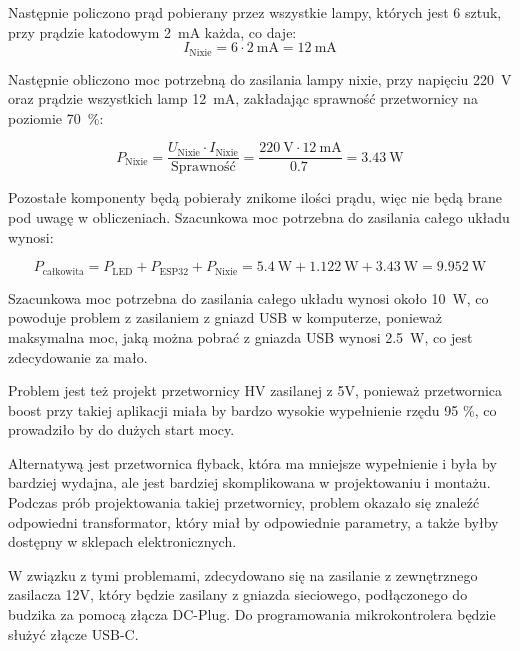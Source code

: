\documentclass{article}
\begin{document}
Następnie policzono prąd pobierany przez wszystkie lampy, których jest 6 sztuk, przy prądzie katodowym \SI{2}{\milli\ampere} każda, co daje:
\begin{equation}
    I_{\text{Nixie}} = 6 \cdot \SI{2}{\milli\ampere} = \SI{12}{\milli\ampere}
\end{equation}

Następnie obliczono moc potrzebną do zasilania lampy nixie, przy napięciu \SI{220}{\volt} oraz prądzie wszystkich lamp \SI{12}{\milli\ampere}, zakładając 
sprawność przetwornicy na poziomie \SI{70}{\percent}:

\begin{equation}
    P_{\text{Nixie}} = \frac{U_{\text{Nixie}} \cdot I_{\text{Nixie}}}{\text{Sprawność}} = \frac{\SI{220}{\volt} \cdot \SI{12}{\milli\ampere}}{\SI{0.7}{}} = \SI{3.43}{\watt}
\end{equation}

Pozostałe komponenty będą pobierały znikome ilości prądu, więc nie będą brane pod uwagę w obliczeniach.
Szacunkowa moc potrzebna do zasilania całego układu wynosi:

\begin{equation}
    P_{\text{całkowita}} = P_{\text{LED}} + P_{\text{ESP32}} + P_{\text{Nixie}} = \SI{5.4}{\watt} + \SI{1.122}{\watt} + \SI{3.43}{\watt} = \SI{9.952}{\watt}
\end{equation}

Szacunkowa moc potrzebna do zasilania całego układu wynosi około \SI{10}{\watt}, co powoduje problem z zasilaniem z gniazd USB w komputerze,
ponieważ maksymalna moc, jaką można pobrać z gniazda USB wynosi \SI{2.5}{\watt}, co jest zdecydowanie za mało.

Problem jest też projekt przetwornicy HV zasilanej z 5V, ponieważ przetwornica boost przy takiej aplikacji miała by bardzo wysokie wypełnienie rzędu 95 \%,
co prowadziło by do dużych start mocy.

Alternatywą jest przetwornica flyback, która ma mniejsze wypełnienie i była by bardziej wydajna, ale jest bardziej skomplikowana w projektowaniu i montażu.
Podczas prób projektowania takiej przetwornicy, problem okazało się znaleźć odpowiedni transformator, który miał by odpowiednie parametry,
a także byłby dostępny w sklepach elektronicznych.

W związku z tymi problemami, zdecydowano się na zasilanie z zewnętrznego zasilacza 12V, który będzie zasilany z gniazda sieciowego, 
podłączonego do budzika za pomocą złącza DC-Plug. Do programowania mikrokontrolera będzie służyć złącze USB-C.
\end{document}

